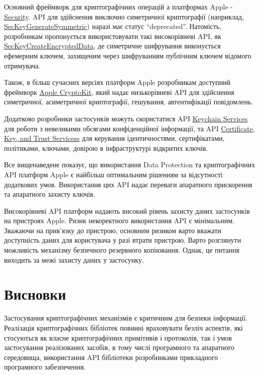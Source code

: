 \documentclass{kpi-lab}
\begin{document}
Основний фреймворк для криптографічних операцій а
платформах Apple -
\href{https://developer.apple.com/documentation/security}{Security}.
API для здійснення виключно симетричної криптографії
(наприклад,
\href{https://developer.apple.com/documentation/security/seckeygeneratesymmetric(_:_:)}{SecKeyGenerateSymmetric})
наразі має статус \enquote{deprecated}.
Натомість, розробникам пропонується використовувати такі
високорівневі API, як
\href{https://developer.apple.com/documentation/security/seckeycreateencrypteddata(_:_:_:_:)}{SecKeyCreateEncryptedData},
де симетричне шифрування виконується ефемерним ключем,
захищеним через шифруванням публічним ключем відомого отримувача.

Також, в більш сучасних версіях платформ Apple розробникам
доступний фреймворк
\href{https://developer.apple.com/documentation/cryptokit}
{Apple CryptoKit},
який надає низькорівневі API для здійснення
симетричної,
асиметричної криптографії,
гешування,
автентифікації повідомлень.

Додатково розробники застосунків можуть скористатися API
\href{https://developer.apple.com/documentation/security/keychain-services}
{Keychain Services} для роботи з невеликими обсягами конфіденційної
інформації, та API
\href{https://developer.apple.com/documentation/security/certificate-key-and-trust-services}{Certificate,
Key, and Trust Servicess}
для керування
ідентичностями,
сертифікатами,
політиками,
ключами,
довірою
в інфраструктурі відкритих ключів.

Все вищенаведене показує, що використання
Data Protection та криптографічних API
платформ Apple є найбільш оптимальним рішенням за
відсутності додаткових умов.
Використання цих API надає переваги апаратного
прискорення та апаратного захисту ключів.

Високорівневі API платформ надають
високий рівень захисту даних застосунків на пристроях Apple.
Ризик некоректного використання API є мінімальним.
Зважаючи на прив'язку до пристрою, основним ризиком варто вважати
доступність даних для користувача у разі втрати пристрою.
Варто розглянути можливість механізму безпечного резервного
копіювання.
Однак, це питання виходить за межі захисту даних у застосунку.

\chapter{Висновки}

Застосування криптографічних
механізмів є критичним для безпеки інформації.
Реалізація криптографічних бібліотек повинні враховувати
безліч аспектів, які стосуються як власне криптографічних
примітивів і протоколів,
так і умов застосування реалізованих засобів,
в тому числі програмного та апаратного середовища,
використання API бібліотеки розробниками прикладного
програмного забезпечення.
\end{document}
